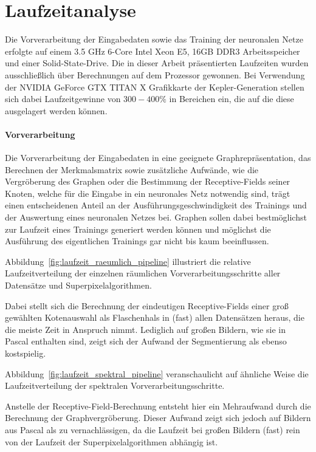 \section{Laufzeitanalyse}
\label{laufzeitanalyse}

Die Vorverarbeitung der Eingabedaten sowie das Training der neuronalen Netze erfolgte auf einem 3.5 GHz 6-Core Intel Xeon E5, 16GB DDR3 Arbeitsspeicher und einer Solid-State-Drive.
Die in dieser Arbeit präsentierten Laufzeiten wurden ausschließlich über Berechnungen auf dem Prozessor gewonnen.
Bei Verwendung der NVIDIA GeForce GTX TITAN X Grafikkarte der Kepler-Generation stellen sich dabei Laufzeitgewinne von $300 - 400 \%$ in Bereichen ein, die auf die diese ausgelagert werden können.

\paragraph{Vorverarbeitung}

Die Vorverarbeitung der Eingabedaten in eine geeignete Graph\-re\-prä\-sen\-ta\-tion, das Berechnen der Merkmalsmatrix sowie zusätzliche Aufwände, wie die Vergröberung des Graphen oder die Bestimmung der Receptive-Fields seiner Knoten, welche für die Eingabe in ein neuronales Netz notwendig sind, trägt einen entscheidenen Anteil an der Ausführungsgeschwindigkeit des Trainings und der Auswertung eines neuronalen Netzes bei.
Graphen sollen dabei bestmöglichst zur Laufzeit eines Trainings generiert werden können und möglichst die Ausführung des eigentlichen Trainings gar nicht bis kaum beeinflussen.

Abbildung~\ref{fig:laufzeit_raeumlich_pipeline} illustriert die relative Laufzeitverteilung der einzelnen räumlichen Vorverarbeitungsschritte \bzgl{} aller Datensätze und Superpixelalgorithmen.

Dabei stellt sich die Berechnung der eindeutigen Receptive-Fields einer groß gewählten Kotenauswahl als Flaschenhals in (fast) allen Datensätzen heraus, die die meiste Zeit in Anspruch nimmt.
Lediglich auf großen Bildern, wie sie in \gls{Pascal} enthalten sind, zeigt sich der Aufwand der Segmentierung als ebenso kostspielig.

Abbildung~\ref{fig:laufzeit_spektral_pipeline} veranschaulicht auf ähnliche Weise die Laufzeitverteilung der spektralen Vorverarbeitungsschritte.

Anstelle der Receptive-Field-Berechnung entsteht hier ein Mehraufwand durch die Berechnung der Graphvergröberung.
Dieser Aufwand zeigt sich jedoch auf Bildern aus \gls{Pascal} als zu vernachlässigen, da die Laufzeit bei großen Bildern (fast) rein von der Laufzeit der Superpixelalgorithmen abhängig ist.

